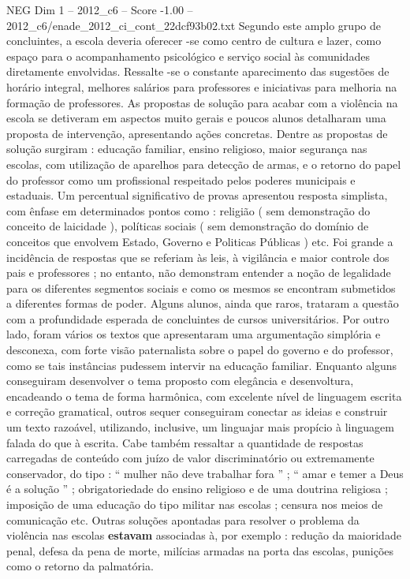 \begin{textsample}{NEG Dim 1 – 2012\_c6 – Score -1.00 – 2012\_c6/enade\_2012\_ci\_cont\_22dcf93b02.txt}
Segundo este amplo grupo de concluintes, a escola deveria oferecer -se como centro de cultura e lazer, como espaço para o acompanhamento psicológico e serviço social às comunidades diretamente envolvidas.
Ressalte -se o constante aparecimento das sugestões de horário integral, melhores salários para professores e iniciativas para melhoria na formação de professores.
As propostas de solução para acabar com a violência na escola se detiveram em aspectos muito gerais e poucos alunos detalharam uma proposta de intervenção, apresentando ações concretas.
Dentre as propostas de solução surgiram : educação familiar, ensino religioso, maior segurança nas escolas, com utilização de aparelhos para detecção de armas, e o retorno do papel do professor como um profissional respeitado pelos poderes municipais e estaduais.
Um percentual significativo de provas apresentou resposta simplista, com ênfase em determinados pontos como : religião ( sem demonstração do conceito de laicidade ), políticas sociais ( sem demonstração do domínio de conceitos que envolvem Estado, Governo e Politicas Públicas ) etc.
Foi grande a incidência de respostas que se referiam às leis, à vigilância e maior controle dos pais e professores ; no entanto, não demonstram entender a noção de legalidade para os diferentes segmentos sociais e como os mesmos se encontram submetidos a diferentes formas de poder.
Alguns alunos, ainda que raros, trataram a questão com a profundidade esperada de concluintes de cursos universitários.
Por outro lado, foram vários os textos que apresentaram uma argumentação simplória e desconexa, com forte visão paternalista sobre o papel do governo e do professor, como se tais instâncias pudessem intervir na educação familiar.
Enquanto alguns conseguiram desenvolver o tema proposto com elegância e desenvoltura, encadeando o tema de forma harmônica, com excelente nível de linguagem escrita e correção gramatical, outros sequer conseguiram conectar as ideias e construir um texto razoável, utilizando, inclusive, um linguajar mais propício à linguagem falada do que à escrita.
Cabe também ressaltar a quantidade de respostas carregadas de conteúdo com juízo de valor discriminatório ou extremamente conservador, do tipo : “ mulher não deve trabalhar fora ” ; “ amar e temer a Deus é a solução ” ; obrigatoriedade do ensino religioso e de uma doutrina religiosa ; imposição de uma educação do tipo militar nas escolas ; censura nos meios de comunicação etc.
Outras soluções apontadas para resolver o problema da violência nas escolas \textbf{estavam} associadas à, por exemplo : redução da maioridade penal, defesa da pena de morte, milícias armadas na porta das escolas, punições como o retorno da palmatória.

\end{textsample}
